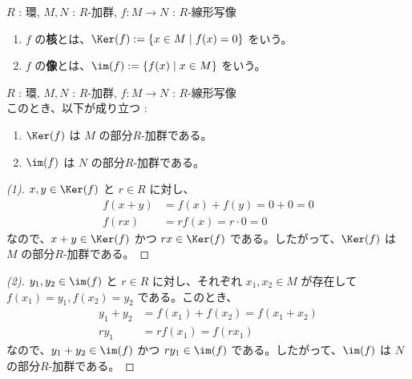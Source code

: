 \documentclass[article,paper=a4paper]{jlreq}
\begin{document}
\begin{dfn}
  \quad $R$ : 環, $M, N$ : $R$-加群, $f \colon M \to N$ : $R$-\hspace{0pt}線形写像
  \begin{enumerate}[label=(\arabic*)\,]
    \item $f$ の\textbf{核}とは、$\Ker(f) := \{x \in M \mid f(x) = 0\}$ をいう。
    \item $f$ の\textbf{像}とは、$\im(f) := \{f(x) \mid x \in M\}$ をいう。
  \end{enumerate}
\end{dfn}

\begin{prop}
  \quad $R$ : 環, $M, N$ : $R$-加群, $f \colon M \to N$ : $R$-\hspace{0pt}線形写像\\
  このとき、以下が成り立つ :
\begin{enumerate}[label=(\arabic*)\,]
  \item $\Ker(f)$ は $M$ の部分$R$-\hspace{0pt}加群である。
  \item $\im(f)$ は $N$ の部分$R$-\hspace{0pt}加群である。
\end{enumerate}
\end{prop}

\begin{proof}[(1)]
  $x, y \in \Ker(f)$ と $r \in R$ に対し、
  \begin{align*}
    f(x+y) &= f(x) + f(y) = 0 + 0 = 0 \\
    f(rx) &= rf(x) = r\cdot 0 = 0
  \end{align*}
  なので、$x+y \in \Ker(f)$ かつ $rx \in \Ker(f)$ である。したがって、$\Ker(f)$ は $M$ の部分$R$-\hspace{0pt}加群である。
\end{proof}

\begin{proof}[(2)]
  $y_1, y_2 \in \im(f)$ と $r \in R$ に対し、それぞれ $x_1, x_2 \in M$ が存在して $f(x_1) = y_1, f(x_2) = y_2$ である。このとき、
  \begin{align*}
    y_1 + y_2 &= f(x_1) + f(x_2) = f(x_1 + x_2) \\
    ry_1 &= r f(x_1) = f(rx_1)
  \end{align*}
  なので、$y_1 + y_2 \in \im(f)$ かつ $ry_1 \in \im(f)$ である。したがって、$\im(f)$ は $N$ の部分$R$-\hspace{0pt}加群である。
\end{proof}
\end{document}
